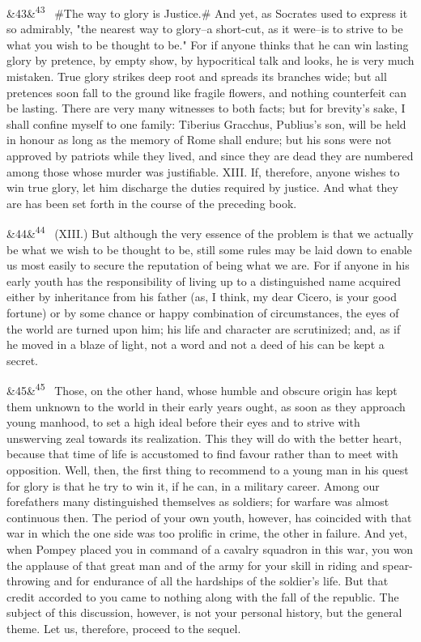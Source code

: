 \documentclass[12pt]{article}
\newcommand{\para}[1][]{\par\noindent\ifx&#1&\else\textsuperscript{\footnotesize #1}~\fi}
\begin{document}
\para[43] \#The way to glory is Justice.\# And yet, as Socrates used to express it so admirably, "the nearest way to glory--a short-cut, as it were--is to strive to be what you wish to be thought to be." For if anyone thinks that he can win lasting glory by pretence, by empty show, by hypocritical talk and looks, he is very much mistaken. True glory strikes deep root and spreads its branches wide; but all pretences soon fall to the ground like fragile flowers, and nothing counterfeit can be lasting. There are very many witnesses to both facts; but for brevity's sake, I shall confine myself to one family: Tiberius Gracchus, Publius's son, will be held in honour as long as the memory of Rome shall endure; but his sons were not approved by patriots while they lived, and since they are dead they are numbered among those whose murder was justifiable. XIII. If, therefore, anyone wishes to win true glory, let him discharge the duties required by justice. And what they are has been set forth in the course of the preceding book.

\para[44] (XIII.) But although the very essence of the problem is that we actually be what we wish to be thought to be, still some rules may be laid down to enable us most easily to secure the reputation of being what we are. For if anyone in his early youth has the responsibility of living up to a distinguished name acquired either by inheritance from his father (as, I think, my dear Cicero, is your good fortune) or by some chance or happy combination of circumstances, the eyes of the world are turned upon him; his life and character are scrutinized; and, as if he moved in a blaze of light, not a word and not a deed of his can be kept a secret.

\para[45] Those, on the other hand, whose humble and obscure origin has kept them unknown to the world in their early years ought, as soon as they approach young manhood, to set a high ideal before their eyes and to strive with unswerving zeal towards its realization. This they will do with the better heart, because that time of life is accustomed to find favour rather than to meet with opposition. Well, then, the first thing to recommend to a young man in his quest for glory is that he try to win it, if he can, in a military career. Among our forefathers many distinguished themselves as soldiers; for warfare was almost continuous then. The period of your own youth, however, has coincided with that war in which the one side was too prolific in crime, the other in failure. And yet, when Pompey placed you in command of a cavalry squadron in this war, you won the applause of that great man and of the army for your skill in riding and spear-throwing and for endurance of all the hardships of the soldier's life. But that credit accorded to you came to nothing along with the fall of the republic. The subject of this discussion, however, is not your personal history, but the general theme. Let us, therefore, proceed to the sequel.
\end{document}

